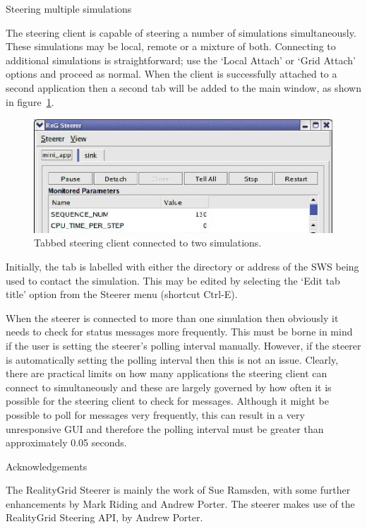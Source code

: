 \documentclass[a4paper,twoside]{article}
\begin{document}
\begin{section}{Steering multiple simulations}
\label{sec:multiple_sims}

The steering client is capable of steering a number of simulations
simultaneously.  These simulations may be local, remote or a mixture
of both.  Connecting to additional simulations is straightforward; use
the `Local Attach' or `Grid Attach' options and proceed as normal.  When
the client is successfully attached to a second application then a
second tab will be added to the main window, as shown in
figure~\ref{fig:tabbed}.

\begin{figure}
\centerline{\includegraphics{tabbed_steerer.eps}}
\caption{Tabbed steering client connected to two simulations.}
\label{fig:tabbed}
\end{figure}

Initially, the tab is labelled with either the directory or address of the
SWS being used to contact the simulation.  This may be edited by
selecting the `Edit tab title' option from the Steerer menu (shortcut
Ctrl-E).

When the steerer is connected to more than one simulation then
obviously it needs to check for status messages more frequently.  This
must be borne in mind if the user is setting the steerer's polling
interval manually.  However, if the steerer is automatically setting
the polling interval then this is not an issue.  Clearly, there are
practical limits on how many applications the steering client can
connect to simultaneously and these are largely governed by how often
it is possible for the steering client to check for messages.
Although it might be possible to poll for messages very frequently,
this can result in a very unresponsive GUI and therefore the polling
interval must be greater than approximately 0.05 seconds.

\end{section} %


\begin{section}{Acknowledgements}

The RealityGrid Steerer is mainly the work of Sue Ramsden, with some
further enhancements by Mark Riding and Andrew Porter. The steerer makes
use of the RealityGrid Steering API, by Andrew Porter.

\end{section}
\end{document}
